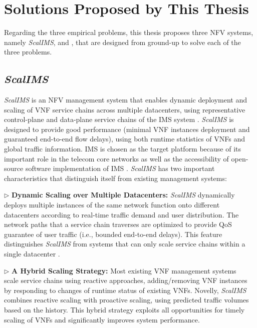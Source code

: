 \section{Solutions Proposed by This Thesis}

Regarding the three empirical problems, this thesis proposes three NFV systems, namely \textit{ScalIMS}, \nfactor and \netstar, that are designed from ground-up to solve each of the three problems.

\subsection{\textit{ScalIMS}}

\textit{ScalIMS} is an NFV management system that enables dynamic deployment and scaling of VNF service chains across multiple datacenters, using representative control-plane and data-plane service chains of the IMS system \cite{3gpp-ims}. \textit{ScalIMS} is designed to provide good performance (minimal VNF instances deployment and guaranteed end-to-end flow delays), using both runtime statistics of VNFs and global traffic information. IMS is chosen as the target platform because of its important role in the telecom core networks as well as the accessibility of open-source software implementation of IMS \cite{project-clearwater}. \textit{ScalIMS} has two important characteristics that distinguish itself from existing management systems:

$\triangleright$ \textbf{Dynamic Scaling over Multiple Datacenters:} \textit{ScalIMS} dynamically deploys multiple instances of the same network function onto different datacenters according to real-time traffic demand and user distribution. The network paths that a service chain traverses are optimized to provide QoS guarantee of user traffic (i.e., bounded end-to-end delays). This feature distinguishes \textit{ScalIMS} from systems that can only scale service chains within a single datacenter \cite{palkar2015e2, gember2012stratos}.

$\triangleright$ \textbf{A Hybrid Scaling Strategy:} Most existing VNF management systems~\cite{wood2007black}~\cite{gember2012stratos} scale service chains using reactive approaches, adding/removing VNF instances by responding to changes of runtime status of existing VNFs. Novelly, \textit{ScalIMS} combines reactive scaling with proactive scaling, using predicted traffic volumes based on the history. This hybrid strategy exploits all opportunities for timely scaling of VNFs and significantly improves system performance.

